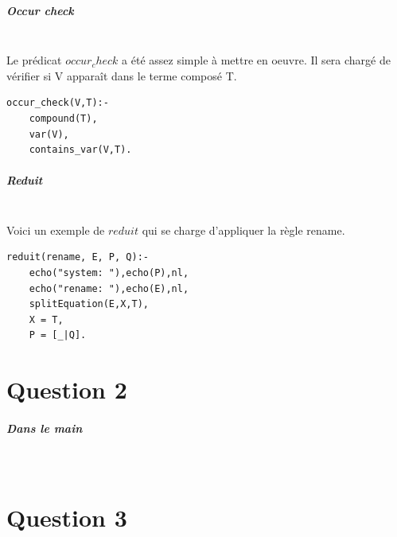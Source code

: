 \documentclass[10pt,a4paper]{report}
\begin{document}
\paragraph{Occur check} ~\\
Le prédicat $occur_check$ a été assez simple à mettre en oeuvre. Il sera chargé de vérifier si V apparaît dans le terme composé T.
\begin{lstlisting}[caption ={Dans le fichier $main.pl$}]
occur_check(V,T):-
	compound(T),
	var(V),
	contains_var(V,T).
\end{lstlisting}

\paragraph{Reduit} ~\\
Voici un exemple de $reduit$ qui se charge d'appliquer la règle rename.
\begin{lstlisting}[caption ={reduit dans $main.pl$}]
reduit(rename, E, P, Q):-
	echo("system: "),echo(P),nl,
	echo("rename: "),echo(E),nl,
	splitEquation(E,X,T),
	X = T,
	P = [_|Q].
\end{lstlisting}





\chapter*{Question 2}
\paragraph{Dans le main} ~\\



\mbox{}
\newpage
\chapter*{Question 3}
\end{document}
